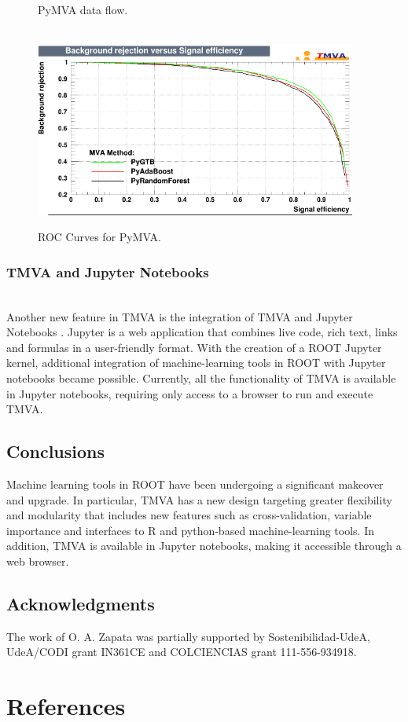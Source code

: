 \documentclass[a4paper]{jpconf}
\begin{document}
\begin{figure}[h]
\begin{minipage}{15pc}
\vspace{6pc}%
\caption{\label{pymvadf}PyMVA data flow. }
\end{minipage}\hspace{2pc}%
\vspace{2pc}
\hspace*{\fill} \\
\includegraphics[width=25pc]{img/pymvaroc.png}\caption{\label{pymvaroc} ROC Curves for PyMVA.}
\end{figure}


\subsubsection{TMVA and Jupyter Notebooks}\hspace*{\fill} \\
Another new feature in TMVA is the integration of TMVA and Jupyter Notebooks \cite{PER-GRA:2007}. Jupyter is a web application that combines live code, rich text, links and formulas in a user-friendly format. With the creation of a ROOT Jupyter kernel, additional integration of machine-learning tools in ROOT with Jupyter notebooks became possible. Currently, all the functionality of TMVA is available in Jupyter notebooks, requiring only access to a browser to run and execute TMVA.



\subsection*{Conclusions}
Machine learning tools in ROOT have been undergoing a significant makeover and upgrade. In particular, TMVA has a new design targeting greater flexibility and modularity that includes new features such as cross-validation, variable importance and interfaces to R and python-based machine-learning tools. In addition, TMVA is available in Jupyter notebooks, making it accessible through a web browser.



\subsection*{Acknowledgments}
The work of O. A. Zapata was partially supported by Sostenibilidad-UdeA, UdeA/CODI grant IN361CE and COLCIENCIAS grant 111-556-934918.\newline


\section*{References}


\end{document}
